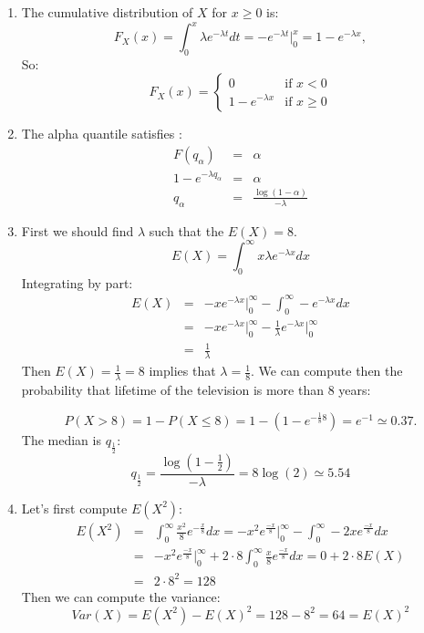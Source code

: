 \documentclass[12pt,thmsa]{article}
\begin{document}
\begin{enumerate}
  \item The cumulative distribution of $X$ for  $x \geq 0$ is:
  \begin{equation*}
  F_X(x)= \int_0^x \lambda e^{-\lambda t} dt = -e^{-\lambda t} \bigg\vert_0^{x}= 1-e^{-\lambda x},
  \end{equation*}
  So:\begin{equation*}
  F_X(x) =
  \begin{cases}
   0                   & \text{if }  x < 0 \\
    1-e^{-\lambda x}      & \text{if } x \geq 0
  \end{cases}
  \end{equation*}
  \item The alpha quantile satisfies :
  \begin{eqnarray*}
    F(q_\alpha) &=& \alpha \\
    1-e^{-\lambda q_\alpha} &=& \alpha \\
    q_\alpha &=& \frac{\log(1-\alpha)}{-\lambda }
  \end{eqnarray*}
  \item First we should find $\lambda$ such that the $E(X)=8$.
\begin{equation*}
        E(X) = \int_0^\infty x \lambda e^{-\lambda x} dx
\end{equation*}
Integrating by part:
  \begin{eqnarray*}
    E(X) &=& -x e^{-\lambda x} \bigg\vert_0^{\infty} -\int_{0}^{\infty} -e^{-\lambda x} dx \\
     &=& -x e^{-\lambda x} \bigg\vert_0^{\infty} -    \frac{1}{\lambda} e^{-\lambda x} \bigg\vert_{0}^\infty \\
     &=& \frac{1}{\lambda}
  \end{eqnarray*}
 Then $E(X)=\frac{1}{\lambda}=8$ implies that $\lambda=\frac{1}{8}$.
 We can compute then the probability that lifetime of the television is more than 8 years:

 \begin{equation*}
    P(X>8)=1-P(X\leq 8)=1-(1-e^{-\frac{1}{8}8})=e^{-1}\simeq 0.37.
 \end{equation*}
 The median is $q_{\frac{1}{2}}$:
 \begin{equation*}
  q_{\frac{1}{2}} = \frac{\log(1-\frac{1}{2})}{-\lambda}=8\log(2) \simeq 5.54
 \end{equation*}
  \item Let's first compute $E(X^2)$:
  \begin{eqnarray*}
  E(X^2)&=& \int_{0}^{\infty} \frac{x^2}{8} e^{-\frac{x}{8}} dx = -x^2 e^{\frac{-x}{8}} \bigg\vert_{0}^{\infty} - \int_{0}^{\infty} -2x e^{\frac{-x}{8}}dx  \\
  &=& -x^2 e^{\frac{-x}{8}} \bigg\vert_{0}^{\infty} + 2\cdot 8 \int_{0}^{\infty} \frac{x}{8} e^{\frac{-x}{8}}dx=0 +2 \cdot 8 E(X) \\
  &=& 2\cdot 8^2=128
  \end{eqnarray*}
  Then we can compute the variance:
  \begin{equation*}
    Var(X)=E(X^2)-E(X)^2=128-8^2=64=E(X)^2
  \end{equation*}
\end{enumerate}
\end{document}
